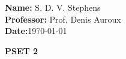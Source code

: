 \documentclass{report}
\begin{document}
\begin{titlebox}[Math 55a]
    \textbf{Name:} S. D. V. Stephens\\[2mm]
    \textbf{Professor:} Prof. Denis Auroux\\[2mm]
    \textbf{Date:}\today 
\tcblower
    \begin{center}
    \vspace{4mm}
    {\Huge\bfseries PSET 2}
    \end{center}
\end{titlebox}
\vspace{10mm}

\qs{}{}
\sol 

\qs{}{}
\sol 

\qs{}{}
\sol
\end{document}
